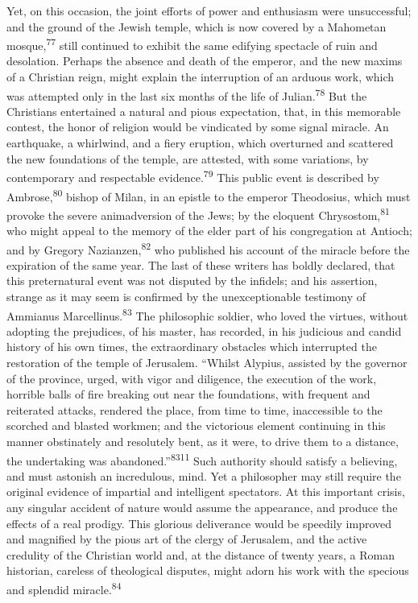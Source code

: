 Yet, on this occasion, the joint efforts of power and enthusiasm
were unsuccessful; and the ground of the Jewish temple, which is
now covered by a Mahometan mosque,\textsuperscript{77} still continued to exhibit
the same edifying spectacle of ruin and desolation. Perhaps the
absence and death of the emperor, and the new maxims of a
Christian reign, might explain the interruption of an arduous
work, which was attempted only in the last six months of the life
of Julian.\textsuperscript{78} But the Christians entertained a natural and pious
expectation, that, in this memorable contest, the honor of
religion would be vindicated by some signal miracle. An
earthquake, a whirlwind, and a fiery eruption, which overturned
and scattered the new foundations of the temple, are attested,
with some variations, by contemporary and respectable evidence.\textsuperscript{79}
This public event is described by Ambrose,\textsuperscript{80} bishop of Milan,
in an epistle to the emperor Theodosius, which must provoke the
severe animadversion of the Jews; by the eloquent Chrysostom,\textsuperscript{81}
who might appeal to the memory of the elder part of his
congregation at Antioch; and by Gregory Nazianzen,\textsuperscript{82} who
published his account of the miracle before the expiration of the
same year. The last of these writers has boldly declared, that
this preternatural event was not disputed by the infidels; and
his assertion, strange as it may seem is confirmed by the
unexceptionable testimony of Ammianus Marcellinus.\textsuperscript{83} The
philosophic soldier, who loved the virtues, without adopting the
prejudices, of his master, has recorded, in his judicious and
candid history of his own times, the extraordinary obstacles
which interrupted the restoration of the temple of Jerusalem.
“Whilst Alypius, assisted by the governor of the province, urged,
with vigor and diligence, the execution of the work, horrible
balls of fire breaking out near the foundations, with frequent
and reiterated attacks, rendered the place, from time to time,
inaccessible to the scorched and blasted workmen; and the
victorious element continuing in this manner obstinately and
resolutely bent, as it were, to drive them to a distance, the
undertaking was abandoned.”\textsuperscript{8311} Such authority should satisfy a
believing, and must astonish an incredulous, mind. Yet a
philosopher may still require the original evidence of impartial
and intelligent spectators. At this important crisis, any
singular accident of nature would assume the appearance, and
produce the effects of a real prodigy. This glorious deliverance
would be speedily improved and magnified by the pious art of the
clergy of Jerusalem, and the active credulity of the Christian
world and, at the distance of twenty years, a Roman historian,
careless of theological disputes, might adorn his work with the
specious and splendid miracle.\textsuperscript{84}

